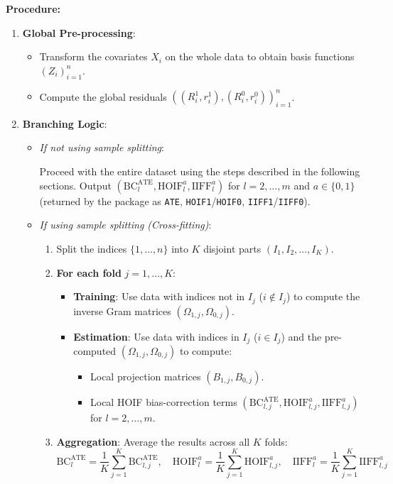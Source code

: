 \documentclass[12pt]{article}
\begin{document}
\textbf{Procedure:}

\begin{enumerate}
  \item \textbf{Global Pre-processing}:
  \begin{itemize}
    \item Transform the covariates $X_i$ on the whole data to obtain basis functions $(Z_i)_{i=1}^n$.
    \item Compute the global residuals $((R_i^1, r_i^1), (R_i^0, r_i^0))_{i=1}^n$.
  \end{itemize}

  \item \textbf{Branching Logic}:
  \begin{itemize}
    \item \textit{If not using sample splitting}:

    Proceed with the entire dataset using the steps described in the following sections. Output $(\mathrm{BC}^{\mathrm{ATE}}_l, \text{HOIF}_l^a, \text{IIFF}_l^a)$ for $l = 2, \ldots, m$ and $a \in \{0,1\}$ (returned by the package as \texttt{ATE}, \texttt{HOIF1}/\texttt{HOIF0}, \texttt{IIFF1}/\texttt{IIFF0}).

    \item \textit{If using sample splitting (Cross-fitting)}:
    \begin{enumerate}
      \item Split the indices $\{1, \ldots, n\}$ into $K$ disjoint parts $(I_1, I_2, \ldots, I_K)$.
      \item \textbf{For each fold} $j = 1, \ldots, K$:
      \begin{itemize}
        \item \textbf{Training}: Use data with indices not in $I_j$ ($i \notin I_j$) to compute the inverse Gram matrices $(\Omega_{1,j}, \Omega_{0,j})$.
        \item \textbf{Estimation}: Use data with indices in $I_j$ ($i \in I_j$) and the pre-computed $(\Omega_{1,j}, \Omega_{0,j})$ to compute:
        \begin{itemize}
          \item Local projection matrices $(B_{1,j}, B_{0,j})$.
          \item Local HOIF bias-correction terms $(\mathrm{BC}^{\mathrm{ATE}}_{l,j}, \text{HOIF}_{l,j}^a, \text{IIFF}_{l,j}^a)$ for $l = 2, \ldots, m$.
        \end{itemize}
      \end{itemize}
      \item \textbf{Aggregation}: Average the results across all $K$ folds:
      \begin{equation}
        \mathrm{BC}^{\mathrm{ATE}}_l = \frac{1}{K} \sum_{j=1}^{K} \mathrm{BC}^{\mathrm{ATE}}_{l,j}, \quad \text{HOIF}_l^a = \frac{1}{K} \sum_{j=1}^{K} \text{HOIF}_{l,j}^a, \quad \text{IIFF}_l^a = \frac{1}{K} \sum_{j=1}^{K} \text{IIFF}_{l,j}^a
      \end{equation}
    \end{enumerate}
  \end{itemize}
\end{enumerate}
\end{document}
